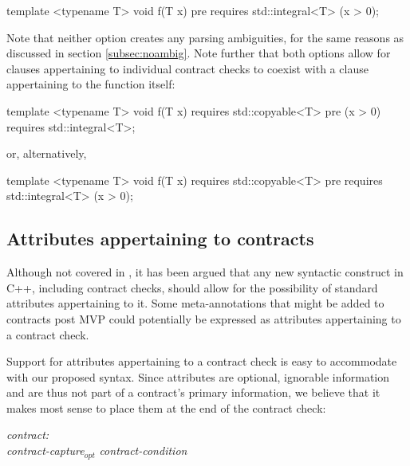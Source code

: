 \begin{codeblock}
template <typename T>
void f(T x)
  pre requires std::integral<T> (x > 0);
\end{codeblock}

Note that neither option creates any parsing ambiguities, for the same reasons as discussed in section \ref{subsec:noambig}. Note further that both options allow for  clauses appertaining to individual contract checks to coexist with a  clause appertaining to the function itself:

\begin{codeblock}
template <typename T>
void f(T x)
  requires std::copyable<T>
  pre (x > 0) requires std::integral<T>;
\end{codeblock}

or, alternatively,

\begin{codeblock}
template <typename T>
void f(T x)
  requires std::copyable<T>
  pre requires std::integral<T> (x > 0);
\end{codeblock}


\subsection{Attributes appertaining to contracts}
\label{subsec:attr}

Although not covered in \cite{P2885R3}, it has been argued that any new syntactic construct in C++, including contract checks, should allow for the possibility of standard attributes appertaining to it. Some meta-annotations that might be added to contracts post MVP could potentially be expressed as attributes appertaining to a contract check.

Support for attributes appertaining to a contract check is easy to accommodate with our proposed syntax. Since attributes are optional, ignorable information and are thus not part of a contract's primary information, we believe that it makes most sense to place them at the end of the contract check:

\begin{adjustwidth}{0.5cm}{0.5cm}

\emph{contract:} \\
\phantom{~~~}\emph{contract-capture}$_{opt}$ \emph{contract-condition} 

\end{adjustwidth}

